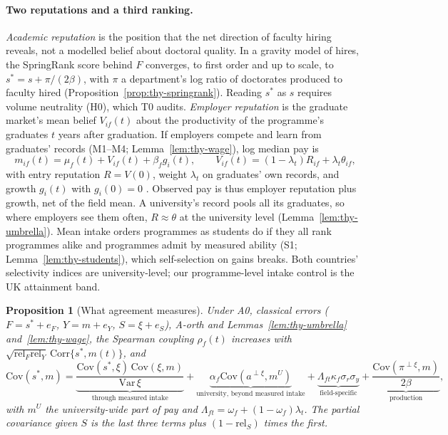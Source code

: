 \documentclass[11pt]{article}
\newtheorem{thyprop}{Proposition}
\begin{document}
\paragraph{Two reputations and a third ranking.} \emph{Academic reputation} is the position that the net direction
of faculty hiring reveals, not a modelled belief about doctoral quality. In a gravity model of hires, the SpringRank
score behind $F$ \citep{wapman2022quantifying, debacco2018physical} converges, to first order and up to scale, to
$s^*=s+\pi/(2\beta)$, with $\pi$ a department's log ratio of doctorates produced to faculty hired
(Proposition~\ref{prop:thy-springrank}). Reading $s^*$ as $s$ requires volume neutrality (H0), which T0 audits.
\emph{Employer reputation} is the graduate market's mean belief $V_{if}(t)$ about the productivity of the programme's
graduates $t$ years after graduation. If employers compete and learn from graduates' records (M1--M4;
Lemma~\ref{lem:thy-wage}), log median pay is
\begin{equation}\label{eq:thy-wage}
m_{if}(t)=\mu_f(t)+V_{if}(t)+\beta_fg_i(t),\qquad V_{if}(t)=(1-\lambda_t)R_{if}+\lambda_t\theta_{if},
\end{equation}
with entry reputation $R=V(0)$, weight $\lambda_t$ on graduates' own records, and growth $g_i(t)$ with $g_i(0)=0$
\citep{farber1996learning}. Observed pay is thus employer reputation plus growth, net of the field mean. A
university's record pools all its graduates, so where employers see them often, $R\approx\theta$ at the university level
(Lemma~\ref{lem:thy-umbrella}). Mean intake orders programmes as students do if they all rank programmes alike and
programmes admit by measured ability (S1; Lemma~\ref{lem:thy-students}), which self-selection on gains
\citep{kirkeboen2016field} breaks. Both countries' selectivity indices are university-level; our programme-level
intake control is the UK attainment band.

\begin{thyprop}[What agreement measures]\label{prop:thy-agree}
Under A0, classical errors ($F=s^*+e_F$, $Y=m+e_Y$, $S=\xi+e_S$), A-orth and Lemmas~\ref{lem:thy-umbrella}
and~\ref{lem:thy-wage}, the Spearman coupling $\rho_f(t)$ increases with
$\sqrt{\mathrm{rel}_F\mathrm{rel}_Y}\,\mathrm{Corr}\{s^*,m(t)\}$, and
\begin{equation}\label{eq:thy-decomp}
\mathrm{Cov}(s^*,m)=\underbrace{\frac{\mathrm{Cov}(s^*,\xi)\,\mathrm{Cov}(\xi,m)}{\mathrm{Var}\,\xi}}_{\text{through measured intake}}
+\underbrace{\alpha_f\mathrm{Cov}(a^{\perp\xi},m^U)}_{\text{university, beyond measured intake}}
+\underbrace{\Lambda_{ft}\kappa_f\sigma_r\sigma_y}_{\text{field-specific}}
+\underbrace{\frac{\mathrm{Cov}(\pi^{\perp\xi},m)}{2\beta}}_{\text{production}},
\end{equation}
with $m^U$ the university-wide part of pay and $\Lambda_{ft}=\omega_f+(1-\omega_f)\lambda_t$. The partial covariance
given $S$ is the last three terms plus $(1-\mathrm{rel}_S)$ times the first.
\end{thyprop}
\end{document}
